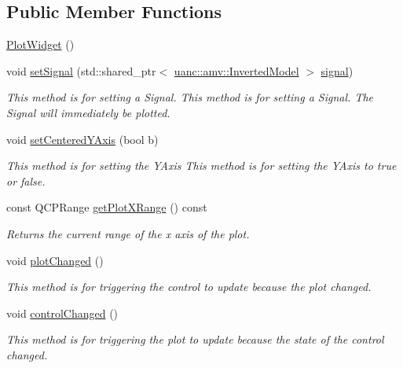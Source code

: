 \subsection*{Public Member Functions}
\begin{DoxyCompactItemize}
\item 
\hyperlink{classuanc_1_1gui_1_1_plot_widget_af448f772ff5abbe5786a7fa0a448e217}{Plot\+Widget} ()
\item 
void \hyperlink{classuanc_1_1gui_1_1_plot_widget_a66a5565461bcb900c4d7003f75781e62}{set\+Signal} (std\+::shared\+\_\+ptr$<$ \hyperlink{classuanc_1_1amv_1_1_inverted_model}{uanc\+::amv\+::\+Inverted\+Model} $>$ \hyperlink{classuanc_1_1gui_1_1_plot_widget_a2c7050da7a3c85ce55cb95ffd1dc2eb8}{signal})
\begin{DoxyCompactList}\small\item\em This method is for setting a Signal. This method is for setting a Signal. The Signal will immediately be plotted. \end{DoxyCompactList}\item 
void \hyperlink{classuanc_1_1gui_1_1_plot_widget_a15f259c15b2db5c26f9181f8a8fca705}{set\+Centered\+Y\+Axis} (bool b)
\begin{DoxyCompactList}\small\item\em This method is for setting the Y\+Axis This method is for setting the Y\+Axis to true or false. \end{DoxyCompactList}\item 
const Q\+C\+P\+Range \hyperlink{classuanc_1_1gui_1_1_plot_widget_add4f78d4efad5b7f27caae2535620e56}{get\+Plot\+X\+Range} () const 
\begin{DoxyCompactList}\small\item\em Returns the current range of the x axis of the plot. \end{DoxyCompactList}\item 
void \hyperlink{classuanc_1_1gui_1_1_plot_widget_a8a2eb029622ad4ec3ee100f9bcc68732}{plot\+Changed} ()
\begin{DoxyCompactList}\small\item\em This method is for triggering the control to update because the plot changed. \end{DoxyCompactList}\item 
void \hyperlink{classuanc_1_1gui_1_1_plot_widget_a9db10479dc8c6590713a18e5a2607138}{control\+Changed} ()
\begin{DoxyCompactList}\small\item\em This method is for triggering the plot to update because the state of the control changed. \end{DoxyCompactList}\item 

\end{DoxyCompactItemize}
